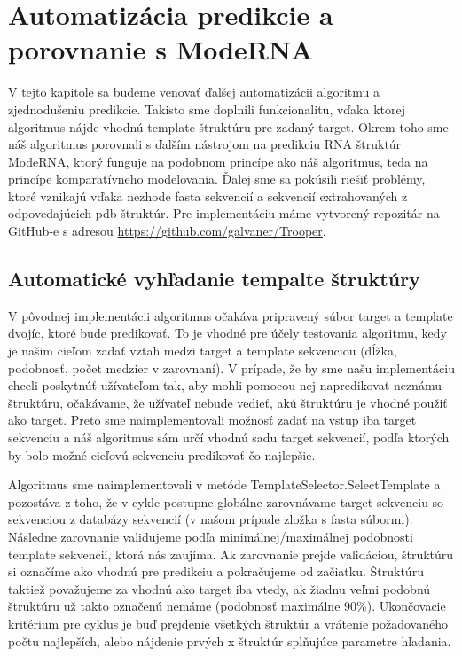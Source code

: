 \chapter{Automatizácia predikcie a porovnanie s ModeRNA}

V tejto kapitole sa budeme venovať ďalšej automatizácii algoritmu a zjednodušeniu predikcie. Takisto sme doplnili funkcionalitu, vďaka ktorej algoritmus nájde vhodnú template štruktúru pre zadaný target. Okrem toho sme náš algoritmus porovnali s ďalším nástrojom na predikciu RNA štruktúr ModeRNA, ktorý funguje na podobnom princípe ako náš algoritmus, teda na princípe komparatívneho modelovania. Ďalej sme sa pokúsili riešiť problémy, ktoré vznikajú vďaka nezhode fasta sekvencií a sekvencií extrahovaných z odpovedajúcich pdb štruktúr. Pre implementáciu máme vytvorený repozitár na GitHub-e s adresou \url{https://github.com/galvaner/Trooper}.

\section{Automatické vyhľadanie tempalte štruktúry}
V pôvodnej implementácii  algoritmus očakáva pripravený súbor target a template dvojíc, ktoré bude predikovať. To je vhodné pre účely testovania algoritmu, kedy je našim cieľom zadať vzťah medzi target a template sekvenciou (dĺžka, podobnosť, počet medzier v zarovnaní). V prípade, že by sme našu implementáciu chceli poskytnúť užívateľom tak, aby mohli pomocou nej napredikovať neznámu štruktúru, očakávame, že užívateľ nebude vedieť, akú štruktúru je vhodné použiť ako target. Preto sme naimplementovali možnosť zadať na vstup iba target sekvenciu a náš algoritmus sám určí vhodnú sadu target sekvencií, podľa ktorých by bolo možné cieľovú sekvenciu predikovať čo najlepšie.


\indent Algoritmus sme naimplementovali v metóde TemplateSelector.SelectTemplate a pozostáva z toho, že v cykle postupne globálne zarovnávame target sekvenciu so sekvenciou z databázy sekvencií (v našom prípade zložka s fasta súbormi). Následne  zarovnanie validujeme podľa minimálnej/maximálnej podobnosti template sekvencií, ktorá nás zaujíma. Ak zarovnanie prejde validáciou, štruktúru si označíme ako vhodnú pre predikciu a pokračujeme od začiatku. Štruktúru taktiež považujeme za vhodnú ako target iba vtedy, ak  žiadnu veľmi podobnú štruktúru už takto označenú nemáme (podobnosť maximálne 90\%). Ukončovacie kritérium pre cyklus je buď prejdenie všetkých štruktúr a vrátenie požadovaného počtu najlepších, alebo nájdenie prvých x štruktúr splňujúce parametre hľadania.



